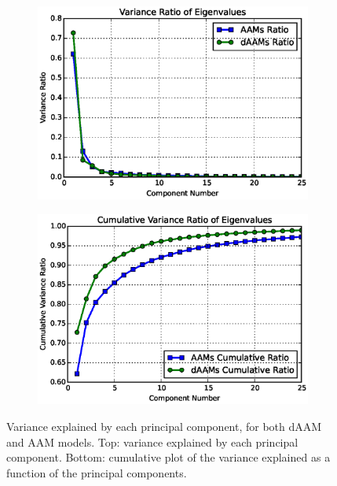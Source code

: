 \begin{figure}[!t]
    \centering
    \begin{subfigure}[b]{0.43\textwidth}
            \includegraphics[width=\textwidth]{Suplementory_Meterial/Model_Analysis/var_ratio}
    \end{subfigure}
    \begin{subfigure}[b]{0.43\textwidth}
            \includegraphics[width=\textwidth]{Suplementory_Meterial/Model_Analysis/cumu_var_ratio}
    \end{subfigure}
    \caption{Variance explained by each principal component, for both dAAM and AAM models. Top: variance explained by each principal component. Bottom: cumulative plot of the variance explained as a function of the principal components.}
    \label{fig:compact}
\end{figure}


